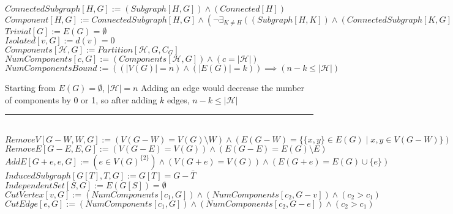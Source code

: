 \documentclass{book}
\newcommand{\abr}{:=}
\newcommand{\pr}[1]{\left(#1\right)}
\newcommand{\st}{\mathbin{|}}
\newcommand{\utup}[1]{\{#1\}}
\begin{document}
$ConnectedSubgraph[H, G] \abr (Subgraph[H, G]) \land (Connected[H])$ \\
$Component[H, G] \abr ConnectedSubgraph[H, G] \land \pr{\lnot \exists_{K \neq H}\pr{(Subgraph[H, K]) \land (ConnectedSubgraph[K, G])}}$ \\
$Trivial[G] \abr E(G) = \emptyset$ \\
$Isolated[v, G] \abr d(v) = 0$ \\

$Components[\mathcal{H}, G] \abr Partition[\mathcal{H}, G, C_G]$ \\
$NumComponents[c, G] \abr (Components[\mathcal{H}, G]) \land (c = |\mathcal{H}|)$ \\

$NumComponentsBound \abr \pr{\pr{|V(G)| = n} \land \pr{|E(G)| = k}} \implies (n - k \leq |\mathcal{H}|)$ \\
\begin{enumerate}
  \lit Starting from $E(G) = \emptyset$, $|\mathcal{H}| = n$
  \lit Adding an edge would decrease the number of components by 0 or 1, so after adding $k$ edges, $n - k \leq |\mathcal{H}|$
\end{enumerate} \vspace{.75mm} \hrule \vspace{.75mm} \ \\

$RemoveV[G - W, W, G] \abr \pr{V(G - W) = V(G) \setminus W} \land \pr{E(G - W) = \{\utup{x, y} \in E(G) \st x, y \in V(G - W)\}}$ \\
$RemoveE[G - E, E, G] \abr \pr{V(G - E) = V(G)} \land \pr{E(G - E) = E(G) \setminus E}$ \\
$AddE[G + e, e, G] \abr \pr{e \in V(G)^{\{2\}}} \land \pr{V(G + e) = V(G)} \land \pr{E(G + e) = E(G) \cup \{e\}}$ \\
$InducedSubgraph[G[T], T, G] \abr G[T] = G - \bar{T}$ \\
$IndependentSet[S, G] \abr E(G[S]) = \emptyset $ \\

$CutVertex[v, G] \abr (NumComponents[c_1, G]) \land (NumComponents[c_2, G - v]) \land (c_2 > c_1)$ \\
$CutEdge[e, G] \abr (NumComponents[c_1, G]) \land (NumComponents[c_2, G - e]) \land (c_2 > c_1)$ \\
\end{document}
